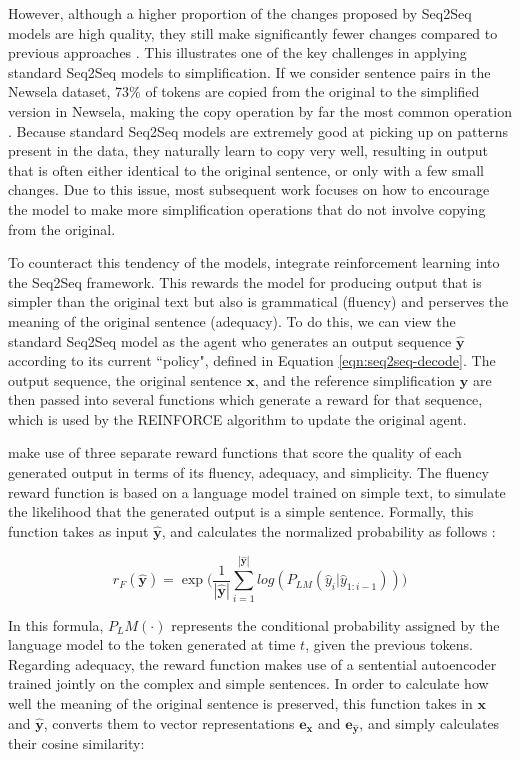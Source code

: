 \documentclass[thesis.tex]{subfiles}
\begin{document}
However, although a higher proportion of the changes proposed by Seq2Seq models are high quality, they still make significantly fewer changes compared to previous approaches \citep{nisioi2017exploring}. This illustrates one of the key challenges in applying standard Seq2Seq models to simplification. If we consider sentence pairs in the Newsela dataset, 73\% of tokens are copied from the original to the simplified version in Newsela, making the copy operation by far the most common operation \citep{zhang2017sentence}. Because standard Seq2Seq models are extremely good at picking up on patterns present in the data, they naturally learn to copy very well, resulting in output that is often either identical to the original sentence, or only with a few small changes. Due to this issue, most subsequent work focuses on how to encourage the model to make more simplification operations that do not involve copying from the original.

To counteract this tendency of the models, \cite{zhang2017sentence} integrate reinforcement learning into the Seq2Seq framework. This rewards the model for producing output that is simpler than the original text but also is grammatical (fluency) and perserves the meaning of the original sentence (adequacy). To do this, we can view the standard Seq2Seq model as the agent who generates an output sequence $\hat{\textbf{y}}$ according to its current ``policy", defined in Equation \ref{eqn:seq2seq-decode}. The output sequence, the original sentence $\textbf{x}$, and the reference simplification $\textbf{y}$ are then passed into several functions which generate a reward for that sequence, which is used by the REINFORCE algorithm to update the original agent. 

\cite{zhang2017sentence} make use of three separate reward functions that score the quality of each generated output in terms of its fluency, adequacy, and simplicity. The fluency reward function is based on a language model trained on simple text, to simulate the likelihood that the generated output is a simple sentence. Formally, this function takes as input $\hat{\textbf{y}}$, and calculates the normalized probability as follows \citep{zhang2017sentence}:

\begin{equation}
    r_F(\hat{\textbf{y}}) = \exp\bigg(\frac{1}{|\hat{\textbf{y}}|} \sum_{i=1}^{|\hat{\textbf{y}}|} log( P_{LM}(\hat{y}_i | \hat{y}_{1:i-1}))\bigg)
\end{equation}

In this formula, $P_LM(\cdot)$ represents the conditional probability assigned by the language model to the token generated at time $t$, given the previous tokens. Regarding adequacy, the reward function makes use of a sentential autoencoder \citep{dai2015semisupervised} trained jointly on the complex and simple sentences. In order to calculate how well the meaning of the original sentence is preserved, this function takes in $\textbf{x}$ and $\hat{\textbf{y}}$, converts them to vector representations $\textbf{e}_{\textbf{x}}$ and $\textbf{e}_{\hat{\textbf{y}}}$, and simply calculates their cosine similarity:
\end{document}
